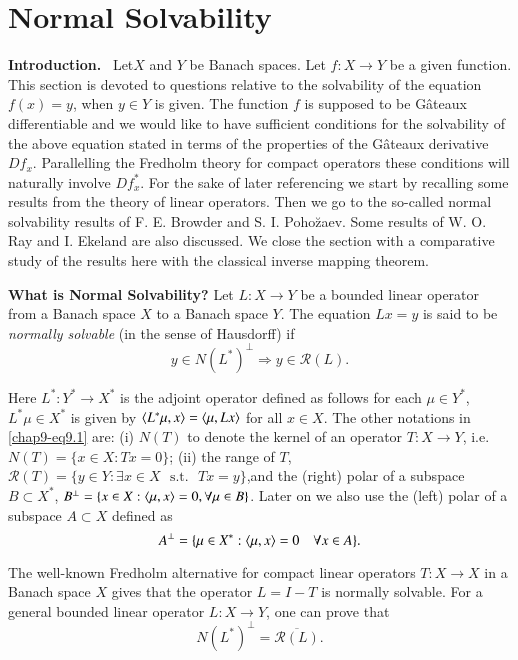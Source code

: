 \chapter{Normal Solvability}\label{chap9}

{\bf Introduction.}~ Let\pageoriginale $X$ and $Y$ be Banach
spaces. Let $f:X\to Y$ be a given function. This section is devoted to
questions relative to the solvability of the equation $f(x)=y$, when
$y\in Y$ is given. The function $f$ is supposed to be G\^ateaux
differentiable and we would like to have sufficient conditions for the
solvability of the above equation stated in terms of the properties of
the G\^ateaux derivative $Df_{x}$. Parallelling the Fredholm theory
for compact operators these conditions will naturally involve
$Df^{*}_{x}$. For the sake of later referencing we start by recalling
some results from the theory of linear operators. Then we go to the
so-called normal solvability results of F. E. Browder and
S. I. Poho\u{z}aev. Some results of W. O. Ray and I. Ekeland are also
discussed. We close the section with a comparative study of the
results here with the classical inverse mapping theorem.

\medskip
\noindent
{\bf What is Normal Solvability?} Let $L:X\to Y$ be a bounded linear
operator from a Banach space $X$ to a Banach space $Y$. The equation
$Lx=y$ is said to be {\em normally solvable} (in the sense of
Hausdorff) if
\begin{equation*}
y\in N(L^{*})^{\perp}\Rightarrow y\in
\mathcal{R}(L).\tag{9.1}\label{chap9-eq9.1} 
\end{equation*}

Here $L^{*}:Y^{*}\to X^{*}$ is the adjoint operator defined as follows
for each $\mu\in Y^{*}$, $L^{*}\mu \in X^{*}$ is given by $\langle
L^{*}\mu,x\rangle=\langle\mu,Lx\rangle$ for all $x\in X$. The other notations in
\eqref{chap9-eq9.1} are: (i) $N(T)$ to denote the kernel of an
operator $T:X\to Y$, i.e.\@ $N(T)=\{x\in X:Tx=0\}$; (ii) the range of
$T$, $\mathcal{R}(T)=\{y\in Y:\exists x\in X \text{~ s.t.~ }
Tx=y\}$,\pageoriginale and the (right) polar of a subspace $B\subset
X^{*}$, $B^{\perp}=\{x\in X:\langle \mu,x\rangle=0,\forall \mu\in B\}$. Later
on we also use the (left) polar of a subspace $A\subset X$ defined as
$$
A^{\perp}=\{\mu\in X^{*}:\langle \mu,x\rangle=0\quad \forall x\in A\}.
$$

The well-known Fredholm alternative for compact linear operators
$T:X\to X$ in a Banach space $X$ gives that the operator $L=I-T$ is
normally solvable. For a general bounded linear operator $L:X\to Y$,
one can prove that
\begin{equation*}
N(L^{*})^{\perp}=\overline{\mathcal{R}(L)}.\tag{9.2}\label{chap9-eq9.2} 
\end{equation*}

